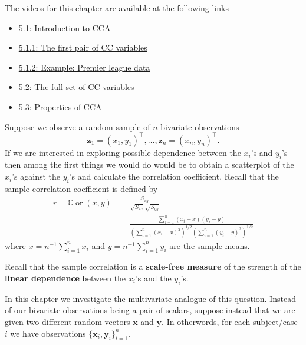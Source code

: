 \documentclass[
]{book}
\providecommand{\tightlist}{%
  \setlength{\itemsep}{0pt}\setlength{\parskip}{0pt}}
\theoremstyle{definition}
\theoremstyle{definition}
\theoremstyle{definition}
\theoremstyle{definition}
\theoremstyle{remark}
\begin{document}
The videos for this chapter are available at the following links

\begin{itemize}
\tightlist
\item
  \href{https://mediaspace.nottingham.ac.uk/media/CCA+Introduction/1_qhk7v35f}{5.1: Introduction to CCA}
\item
  \href{https://mediaspace.nottingham.ac.uk/media/CCAA+First+CC/1_yjm6kkxf}{5.1.1: The first pair of CC variables}
\item
  \href{https://mediaspace.nottingham.ac.uk/media/CCAA+Football+Example/1_r2v6924j}{5.1.2: Example: Premier league data}
\item
  \href{https://mediaspace.nottingham.ac.uk/media/CCAA+Full+Set/1_xmdoi9i6}{5.2: The full set of CC variables}
\item
  \href{https://mediaspace.nottingham.ac.uk/media/CCA\%3A\%20Properties/1_g24h27bj}{5.3: Properties of CCA}
\end{itemize}

Suppose we observe a random sample of \(n\) bivariate observations
\[
\mathbf z_1=(x_1,y_1)^\top , \ldots , \mathbf z_n=(x_n,y_n)^\top.
\]
If we are interested in exploring possible dependence between the \(x_i\)'s and \(y_i\)'s then among the first things we would do would be to obtain a scatterplot of the \(x_i\)'s against the \(y_i\)'s and calculate the correlation coefficient. Recall that the sample correlation coefficient is defined by
\begin{align}
r={\mathbb{C}\operatorname{or}}(x,y)&=\frac{S_{xy}}{\sqrt{S_{xx}}\sqrt{S_{yy}}}\\
&=\frac{\sum_{i=1}^n (x_i-\bar{x})(y_i-\bar{y})}{\left(\sum_{i=1}^n (x_i-\bar{x})^2  \right)^{1/2}  \left(\sum_{i=1}^n (y_i-\bar{y})^2 \right)^{1/2}}
\label{eq:scr}
\end{align}
where \(\bar{x}=n^{-1}\sum_{i=1}^n x_i\) and \(\bar{y}=n^{-1}\sum_{i=1}^n y_i\) are the sample means.

Recall that the sample correlation is a \textbf{scale-free measure} of the strength of the \textbf{linear dependence} between the \(x_i\)'s and the \(y_i\)'s.

In this chapter we investigate the multivariate analogue of this question. Instead of our bivariate observations being a pair of scalars, suppose instead that we are given two different random vectors \(\mathbf x\) and \(\mathbf y\). In otherwords, for each subject/case \(i\) we have observations
\(\{\mathbf x_i,\mathbf y_i\}_{i=1}^n.\)
\end{document}
